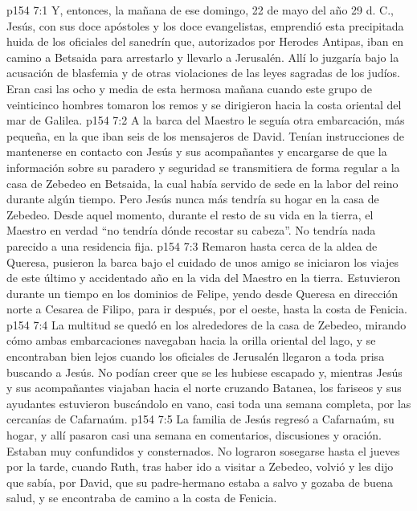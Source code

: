 \vs p154 7:1 Y, entonces, la mañana de ese domingo, 22 de mayo del año 29 d. C., Jesús, con sus doce apóstoles y los doce evangelistas, emprendió esta precipitada huida de los oficiales del sanedrín que, autorizados por Herodes Antipas, iban en camino a Betsaida para arrestarlo y llevarlo a Jerusalén. Allí lo juzgaría bajo la acusación de blasfemia y de otras violaciones de las leyes sagradas de los judíos. Eran casi las ocho y media de esta hermosa mañana cuando este grupo de veinticinco hombres tomaron los remos y se dirigieron hacia la costa oriental del mar de Galilea.
\vs p154 7:2 A la barca del Maestro le seguía otra embarcación, más pequeña, en la que iban seis de los mensajeros de David. Tenían instrucciones de mantenerse en contacto con Jesús y sus acompañantes y encargarse de que la información sobre su paradero y seguridad se transmitiera de forma regular a la casa de Zebedeo en Betsaida, la cual había servido de sede en la labor del reino durante algún tiempo. Pero Jesús nunca más tendría su hogar en la casa de Zebedeo. Desde aquel momento, durante el resto de su vida en la tierra, el Maestro en verdad “no tendría dónde recostar su cabeza”. No tendría nada parecido a una residencia fija.
\vs p154 7:3 Remaron hasta cerca de la aldea de Queresa, pusieron la barca bajo el cuidado de unos amigo se iniciaron los viajes de este último y accidentado año en la vida del Maestro en la tierra. Estuvieron durante un tiempo en los dominios de Felipe, yendo desde Queresa en dirección norte a Cesarea de Filipo, para ir después, por el oeste, hasta la costa de Fenicia.
\vs p154 7:4 \pc La multitud se quedó en los alrededores de la casa de Zebedeo, mirando cómo ambas embarcaciones navegaban hacia la orilla oriental del lago, y se encontraban bien lejos cuando los oficiales de Jerusalén llegaron a toda prisa buscando a Jesús. No podían creer que se les hubiese escapado y, mientras Jesús y sus acompañantes viajaban hacia el norte cruzando Batanea, los fariseos y sus ayudantes estuvieron buscándolo en vano, casi toda una semana completa, por las cercanías de Cafarnaúm.
\vs p154 7:5 La familia de Jesús regresó a Cafarnaúm, su hogar, y allí pasaron casi una semana en comentarios, discusiones y oración. Estaban muy confundidos y consternados. No lograron sosegarse hasta el jueves por la tarde, cuando Ruth, tras haber ido a visitar a Zebedeo, volvió y les dijo que sabía, por David, que su padre\hyp{}hermano estaba a salvo y gozaba de buena salud, y se encontraba de camino a la costa de Fenicia.
